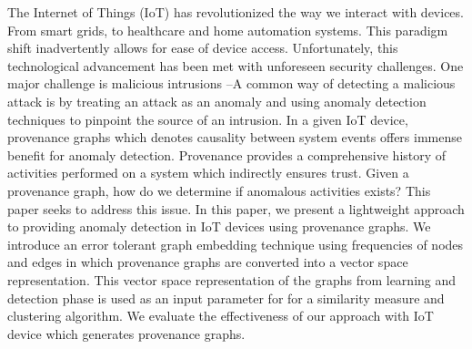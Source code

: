 




The Internet of Things (IoT) has revolutionized the way we interact with devices. From smart grids, to healthcare and home automation systems. This paradigm shift inadvertently allows for ease of device access. Unfortunately, this technological advancement has been met with unforeseen security challenges. One major challenge is malicious intrusions --A common way of detecting a malicious attack is by treating an attack as an  anomaly and using anomaly detection techniques to pinpoint the source of an intrusion. In a given IoT device, provenance graphs which denotes causality  between system events offers immense benefit for anomaly detection. Provenance provides a comprehensive history of activities performed on a system which indirectly ensures trust. Given a provenance graph, how do we determine if anomalous activities exists? This paper seeks to address this issue. In this paper, we present a lightweight approach to providing anomaly detection in IoT devices using provenance graphs. We introduce an error tolerant graph embedding technique using frequencies of nodes and edges in which provenance graphs are converted into a vector space representation. This vector space representation of the graphs from learning and detection phase is used as an input  parameter for for a similarity measure and clustering algorithm. We evaluate the effectiveness of our approach with IoT device which generates provenance graphs.